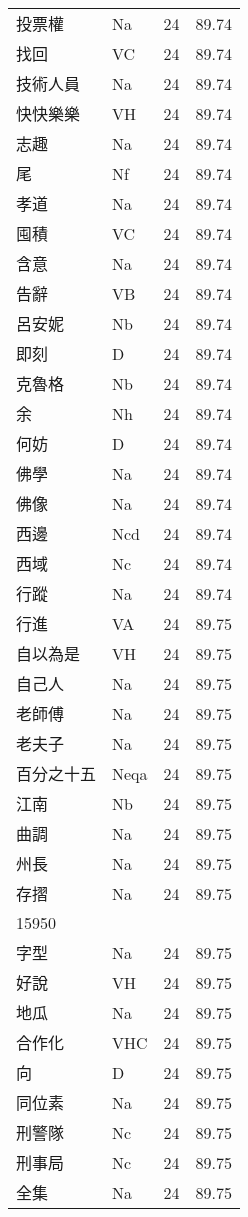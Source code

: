 \documentclass[twocolumn]{book}
\begin{document}
\begin{supertabular}{llrr}
投票權 & Na & 24 &  89.74\\
找回 & VC & 24 &  89.74\\
技術人員 & Na & 24 &  89.74\\
快快樂樂 & VH & 24 &  89.74\\
志趣 & Na & 24 &  89.74\\
尾 & Nf & 24 &  89.74\\
孝道 & Na & 24 &  89.74\\
囤積 & VC & 24 &  89.74\\
含意 & Na & 24 &  89.74\\
告辭 & VB & 24 &  89.74\\
呂安妮 & Nb & 24 &  89.74\\
即刻 & D & 24 &  89.74\\
克魯格 & Nb & 24 &  89.74\\
余 & Nh & 24 &  89.74\\
何妨 & D & 24 &  89.74\\
佛學 & Na & 24 &  89.74\\
佛像 & Na & 24 &  89.74\\
西邊 & Ncd & 24 &  89.74\\
西域 & Nc & 24 &  89.74\\
行蹤 & Na & 24 &  89.74\\
行進 & VA & 24 &  89.75\\
自以為是 & VH & 24 &  89.75\\
自己人 & Na & 24 &  89.75\\
老師傅 & Na & 24 &  89.75\\
老夫子 & Na & 24 &  89.75\\
百分之十五 & Neqa & 24 &  89.75\\
江南 & Nb & 24 &  89.75\\
曲調 & Na & 24 &  89.75\\
州長 & Na & 24 &  89.75\\
存摺 & Na & 24 &  89.75\\
15950\\
字型 & Na & 24 &  89.75\\
好說 & VH & 24 &  89.75\\
地瓜 & Na & 24 &  89.75\\
合作化 & VHC & 24 &  89.75\\
向 & D & 24 &  89.75\\
同位素 & Na & 24 &  89.75\\
刑警隊 & Nc & 24 &  89.75\\
刑事局 & Nc & 24 &  89.75\\
全集 & Na & 24 &  89.75\\

\end{supertabular}
\end{document}
